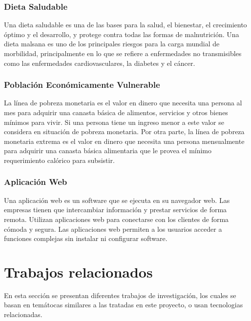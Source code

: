 \subsubsection{Dieta Saludable} \label{DietaSaludable}
\noindent Una dieta saludable es una de las bases para la salud, el bienestar, el crecimiento \'optimo y el desarrollo, y protege contra todas las formas de malnutrici\'on. Una dieta malsana es uno de los principales riesgos para la carga mundial de morbilidad, principalmente en lo que se refiere a enfermedades no transmisibles como las enfermedades cardiovasculares, la diabetes y el c\'ancer.\cite{DietaSana}



\subsubsection{Poblaci\'on Econ\'omicamente Vulnerable}
\noindent  La l\'inea de pobreza monetaria es el valor en dinero que necesita una persona al mes para adquirir una canasta b\'asica de alimentos, servicios y otros bienes m\'inimos para vivir. Si una persona tiene un ingreso menor a este valor se considera en situaci\'on de pobreza monetaria. Por otra parte, la l\'inea de pobreza monetaria extrema es el valor en dinero que necesita una persona mensualmente para adquirir una canasta b\'asica alimentaria que le provea el m\'inimo requerimiento cal\'orico para subsistir.\cite{PobrezaMonetaria}

\subsubsection{Aplicaci\'on Web}
\noindent  Una aplicaci\'on web es un software que se ejecuta en su navegador web. Las empresas tienen que intercambiar informaci\'on y prestar servicios de forma remota. Utilizan aplicaciones web para conectarse con los clientes de forma c\'omoda y segura. Las aplicaciones web permiten a los usuarios acceder a funciones complejas sin instalar ni configurar software.\cite{WhatWebApp}



\section{Trabajos relacionados}\label{trabajosRelacionados}

En esta secci\'on se presentan diferentes trabajos de investigaci\'on, los cuales se basan en tem\'atocas similares a las tratadas en este proyecto, o usan tecnologias relacionadas.

